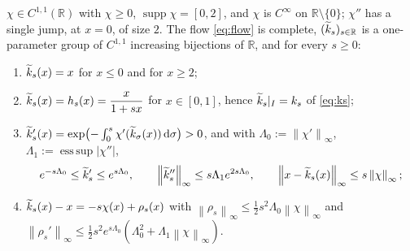 \documentclass[11pt]{article}
\newcommand{\norm}[1]{\left\lVert #1\right\rVert}\newcommand{\abs}[1]{\left|#1\right|}
\begin{document}
\begin{lemma}\label{lem:ext}
$\chi\in C^{1,1}(\mathbb R)$ with $\chi\ge0$, $\operatorname{supp}\chi=[0,2]$, and $\chi$ is
$C^\infty$ on $\mathbb R\setminus\{0\}$; $\chi''$ has a single jump, at $x=0$, of size $2$.
The flow \eqref{eq:flow} is complete, $(\widetilde k_s)_{s\in\mathbb R}$ is a one-parameter group of
$C^{1,1}$ increasing bijections of $\mathbb R$, and for every $s\ge0$:
\begin{enumerate}[label=(E\arabic*),leftmargin=3em]
\item $\widetilde k_s(x)=x$ for $x\le0$ and for $x\ge2$;\label{E1}
\item $\widetilde k_s(x)=h_s(x)=\dfrac x{1+sx}$ for $x\in[0,1]$, hence $\widetilde k_s|_I=k_s$ of \eqref{eq:ks};\label{E2}
\item $\widetilde k_s'(x)=\exp\bigl(-\int_0^s\chi'(\widetilde k_\sigma(x))\,\mathrm d\sigma\bigr)>0$, and with
 $\Lambda_0:=\norm{\chi'}_\infty$, $\Lambda_1:=\operatorname{ess\,sup}|\chi''|$,
 \[
  e^{-s\Lambda_0}\le\kt_s'\le e^{s\Lambda_0},\qquad
  \norm{\kt_s''}_\infty\le s\Lambda_1e^{2s\Lambda_0},\qquad
  \norm{x-\kt_s(x)}_\infty\le s\norm\chi_\infty;\label{E3}
 \]
\item $\widetilde k_s(x)-x=-s\chi(x)+\rho_s(x)$ with
 $\norm{\rho_s}_\infty\le\tfrac12s^2\Lambda_0\norm\chi_\infty$ and
 $\norm{\rho_s'}_\infty\le\tfrac12 s^2 e^{s\Lambda_0}(\Lambda_0^2+\Lambda_1\norm\chi_\infty)$.\label{E4}
\end{enumerate}
\end{lemma}
\end{document}
